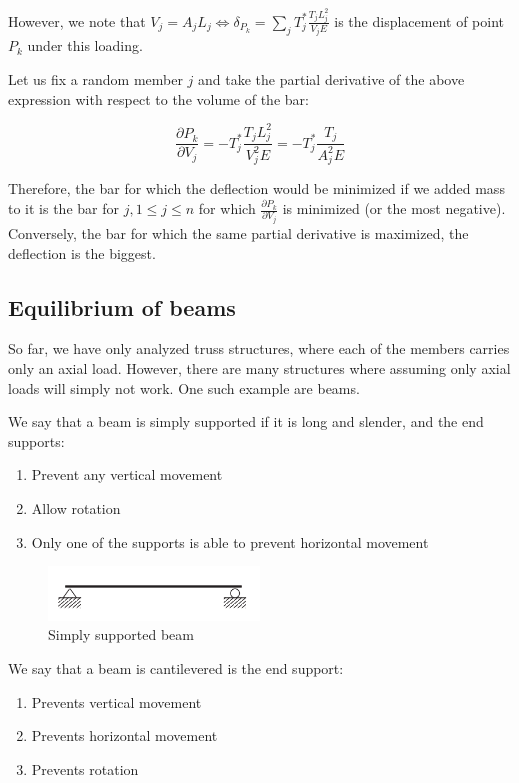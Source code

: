 \documentclass{article}
\begin{document}
However, we note that $V_j = A_jL_j \iff \delta_{P_k} = \sum_j T_j^* \frac{T_jL_j^2}{V_jE}$ is the displacement of point $P_k$ under this loading.

Let us fix a random member $j$ and take the partial derivative of the above expression with respect to the volume of the bar:

\[ \frac{\partial P_k}{\partial V_j} = -T_j^* \frac{T_jL_j^2}{V_j^2E} = -T_j^* \frac{T_j}{A_j^2E}  \]

Therefore, the bar for which the deflection would be minimized if we added mass to it is the bar for $j, 1 \leq j \leq n$ for which $\frac{\partial P_k}{\partial V_j}$ is minimized (or the most negative). Conversely, the bar for which the same partial derivative is maximized, the deflection is the biggest.

\newpage

\subsection{Equilibrium of beams}

So far, we have only analyzed truss structures, where each of the members carries only an axial load. However, there are many structures where assuming only axial loads will simply not work. One such example are beams.

\begin{definition}
    We say that a beam is simply supported if it is long and slender, and the end supports:
    \begin{enumerate}
        \item Prevent any vertical movement
        \item Allow rotation
        \item Only one of the supports is able to prevent horizontal movement
    \end{enumerate}
\end{definition}

\begin{figure}[h]
    \centering
    \includegraphics[width = 0.5\textwidth]{images/simply.png}
    \caption{Simply supported beam}
    \label{fig:enter-label}
\end{figure}

\begin{definition}
    We say that a beam is cantilevered is the end support:
    \begin{enumerate}
        \item Prevents vertical movement
        \item Prevents horizontal movement
        \item Prevents rotation
    \end{enumerate}
\end{definition}
\end{document}
